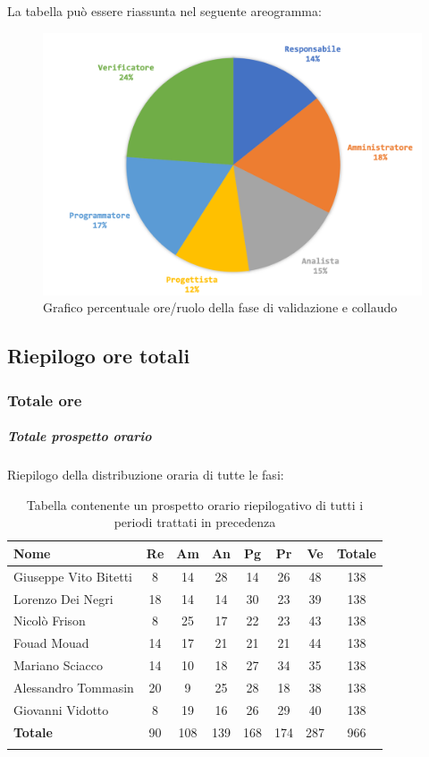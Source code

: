 		La tabella può essere riassunta nel seguente areogramma:
		\begin{figure}[H]
			\centering
			\includegraphics[width=0.8\linewidth]{./images/preventivo/validColl2.png}
			\caption{Grafico percentuale ore/ruolo della fase di validazione e collaudo}
			\label{fig:grafico costi ruolo fase di validazione e collaudo}
		\end{figure}		
		

		
	\subsection{Riepilogo ore totali}
		\subsubsection{Totale ore}
			\subparagraph{Totale prospetto orario }
			Riepilogo della distribuzione oraria di tutte le fasi:
			\begin{longtable}{|l|c|c|c|c|c|c|c|}
				\hline
				\rowcolor{lighter-grayer}
				\textbf{Nome} & \textbf{Re} & \textbf{Am} & \textbf{An} & \textbf{Pg}  & \textbf{Pr}   & \textbf{Ve} & \textbf{Totale} \\
				\hline
				\endfirsthead
				
				\hline
				Giuseppe Vito Bitetti 		& 8 & 14 & 28 & 14 & 26 & 48 & 138\\
				\hline
				\hline
				Lorenzo Dei Negri			& 18 & 14 & 14 & 30 & 23 & 39 & 138\\
				\hline
				\hline
				Nicolò Frison				    & 8 & 25 & 17 & 22 & 23 & 43 & 138\\
				\hline
				\hline
				Fouad Mouad 				 & 14 & 17 & 21 & 21 & 21 & 44 & 138\\
				\hline
				\hline
				Mariano Sciacco 			& 14 & 10 & 18 & 27 & 34 & 35 & 138\\
				\hline
				\hline
				Alessandro Tommasin    & 20 & 9 & 25 & 28 & 18 & 38 & 138\\
				\hline
				\hline
				Giovanni Vidotto 			 & 8 & 19 & 16 & 26 & 29 & 40 & 138\\
				\hline 
				\textbf{Totale}				 & 90 & 108 & 139 & 168 & 174 & 287 & 966\\
				\hline
				\caption{Tabella contenente un prospetto orario riepilogativo di tutti i periodi trattati in precedenza}
			\end{longtable}
			\pagebreak
			
